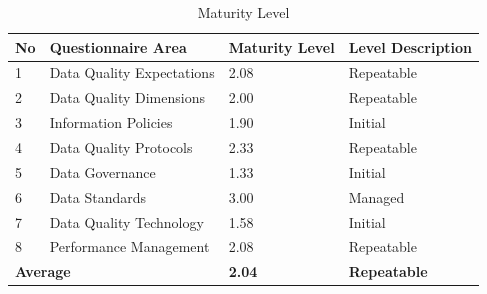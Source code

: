 \documentclass[conference]{IEEEtran}
\begin{document}
\begin{table}[H]
\caption{Maturity Level}
\label{tab:maturity-level}
\centering
\begin{tabular}{|p{0.3cm}|p{3cm}|p{1cm}|p{2cm}|}
\hline
\textbf{No} & \textbf{Questionnaire Area} & \textbf{Maturity Level}&\textbf{Level Description} \\
\hline
1 & Data Quality Expectations & 2.08 & Repeatable\\
\hline
2 & Data Quality Dimensions & 2.00 & Repeatable\\
\hline
3 & Information Policies & 1.90 & Initial\\
\hline
4 & Data Quality Protocols & 2.33 & Repeatable \\
\hline
5 & Data Governance & 1.33 & Initial \\
\hline
6 & Data Standards & 3.00 & Managed \\
\hline
7 & Data Quality Technology & 1.58 & Initial\\
\hline
8 & Performance Management & 2.08 & Repeatable\\
\hline
\multicolumn{2}{|l|}{\textbf{Average}} & \textbf{2.04}& \textbf{Repeatable} \\
\hline
\end{tabular}
\end{table}
\end{document}
